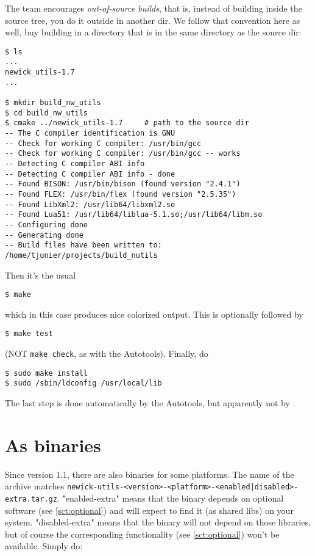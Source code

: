 The \cmake{} team encourages \emph{out-of-source builds}, that is, instead of
building inside the source tree, you do it outside in another dir. We follow
that convention here as well, buy building in a directory that is in the same
directory as the \nutils{} source dir:

\begin{verbatim}
$ ls
...
newick_utils-1.7
...

$ mkdir build_nw_utils
$ cd build_nw_utils
$ cmake ../newick_utils-1.7		# path to the source dir
-- The C compiler identification is GNU
-- Check for working C compiler: /usr/bin/gcc
-- Check for working C compiler: /usr/bin/gcc -- works
-- Detecting C compiler ABI info
-- Detecting C compiler ABI info - done
-- Found BISON: /usr/bin/bison (found version "2.4.1")
-- Found FLEX: /usr/bin/flex (found version "2.5.35")
-- Found LibXml2: /usr/lib64/libxml2.so 
-- Found Lua51: /usr/lib64/liblua-5.1.so;/usr/lib64/libm.so 
-- Configuring done
-- Generating done
-- Build files have been written to: /home/tjunier/projects/build_nutils
\end{verbatim}

Then it's the usual
\begin{verbatim}
$ make
\end{verbatim}
which in this case produces nice colorized output. This is optionally followed
by 
\begin{verbatim}
$ make test
\end{verbatim}
(NOT \texttt{make check}, as with the Autotools). Finally, do
\begin{verbatim}
$ sudo make install
$ sudo /sbin/ldconfig /usr/local/lib
\end{verbatim}
The last step is done automatically by the Autotools, but apparently not by
\cmake.


\section{As binaries}

Since version 1.1, there are also binaries for some platforms. The name of the
archive matches
\texttt{newick-utils-<version>-<platform>-<enabled|disabled>-extra.tar.gz}.
"enabled-extra" means that the binary depends on optional software (see
\ref{sct:optional})  and will expect to find it (as shared libs) on your
system. "disabled-extra" means that the binary will not depend on those
libraries, but of course the corresponding functionality (see
\ref{sct:optional}) won't be available. Simply do: 

